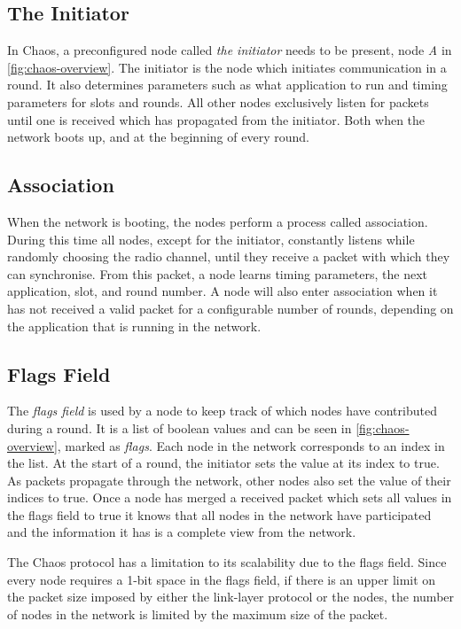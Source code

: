 \subsection{The Initiator}
In Chaos, a preconfigured node called \emph{the initiator} needs to be present, node \textit{A} in \cref{fig:chaos-overview}. The initiator is the node which initiates communication in a round. It also determines parameters such as what application to run and timing parameters for slots and rounds. All other nodes exclusively listen for packets until one is received which has propagated from the initiator. Both when the network boots up, and at the beginning of every round.

\subsection{Association}
When the network is booting, the nodes perform a process called association. During this time all nodes, except for the initiator, constantly listens while randomly choosing the radio channel, until they receive a packet with which they can synchronise. From this packet, a node learns timing parameters, the next application, slot, and round number. A node will also enter association when it has not received a valid packet for a configurable number of rounds, depending on the application that is running in the network.

\subsection{Flags Field}
\label{subsec-flags-field}
The \textit{flags field} is used by a node to keep track of which nodes have contributed during a round. It is a list of boolean values and can be seen in \cref{fig:chaos-overview}, marked as \textit{flags}. Each node in the network corresponds to an index in the list. At the start of a round, the initiator sets the value at its index to true. As packets propagate through the network, other nodes also set the value of their indices to true. Once a node has merged a received packet which sets all values in the flags field to true it knows that all nodes in the network have participated and the information it has is a complete view from the network.

The Chaos protocol has a limitation to its scalability due to the flags field. Since every node requires a 1-bit space in the flags field, if there is an upper limit on the packet size imposed by either the link-layer protocol or the nodes, the number of nodes in the network is limited by the maximum size of the packet. 

